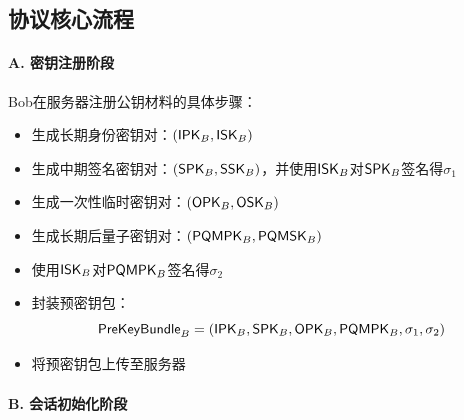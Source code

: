 \subsection{协议核心流程}

\paragraph{A. 密钥注册阶段}
Bob在服务器注册公钥材料的具体步骤：
\begin{itemize}
    \item 生成长期身份密钥对：$(\textsf{IPK}_B, \textsf{ISK}_B)$
  \item 生成中期签名密钥对：$(\textsf{SPK}_B, \textsf{SSK}_B)$，并使用$\textsf{ISK}_B$对$\textsf{SPK}_B$签名得$\sigma_1$
  \item 生成一次性临时密钥对：$(\textsf{OPK}_B, \textsf{OSK}_B)$
  \item 生成长期后量子密钥对：$(\textsf{PQMPK}_B, \textsf{PQMSK}_B)$
  \item 使用$\textsf{ISK}_B$对$\textsf{PQMPK}_B$签名得$\sigma_2$
  \item 封装预密钥包：
        \[
        \textsf{PreKeyBundle}_B = (\textsf{IPK}_B, \textsf{SPK}_B, \textsf{OPK}_B, \textsf{PQMPK}_B, \sigma_1, \sigma_2)
        \]
  \item 将预密钥包上传至服务器
\end{itemize}


\paragraph{B. 会话初始化阶段}


